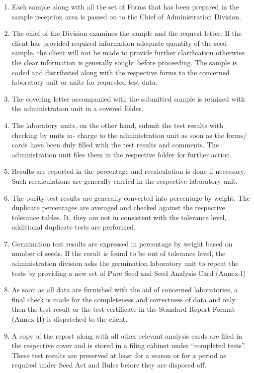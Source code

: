 \documentclass[
]{book}
\providecommand{\tightlist}{%
  \setlength{\itemsep}{0pt}\setlength{\parskip}{0pt}}
\begin{document}
\begin{enumerate}
\def\labelenumi{\arabic{enumi}.}
\tightlist
\item
  Each sample along with all the set of Forms that has been prepared in the sample reception area is passed on to the Chief of Administration Division.
\item
  The chief of the Division examines the sample and the request letter. If the client has provided required information adequate quantity of the seed sample, the client will not be made to provide further clarification otherwise the clear information is generally sought before proceeding. The sample is coded and distributed along with the respective forms to the concerned laboratory unit or units for requested test data.
\item
  The covering letter accompanied with the submitted sample is retained with the administration unit in a covered folder.
\item
  The laboratory units, on the other hand, submit the test results with checking by units in- charge to the administration unit as soon as the forms/ cards have been duly filled with the test results and comments. The administration unit files them in the respective folder for further action.
\item
  Results are reported in the percentage and recalculation is done if necessary. Such recalculations are generally carried in the respective laboratory unit.
\item
  The purity test results are generally converted into percentage by weight. The duplicate percentages are averaged and checked against the respective tolerance tables. It, they are not in consistent with the tolerance level, additional duplicate tests are performed.
\item
  Germination test results are expressed in percentage by weight based on number of seeds. If the result is found to be out of tolerance level, the administration division asks the germination laboratory unit to repeat the tests by providing a new set of Pure Seed and Seed Analysis Card (Annex-I)
\item
  As soon as all data are furnished with the aid of concerned laboratories, a final check is made for the completeness and correctness of data and only then the test result or the test certificate in the Standard Report Format (Annex-II) is dispatched to the client.
\item
  A copy of the report along with all other relevant analysis cards are filed in the respective cover and is stored in a filing cabinet under ``completed tests''. These test results are preserved at least for a season or for a period as required under Seed Act and Rules before they are disposed off.

\end{enumerate}
\end{document}

